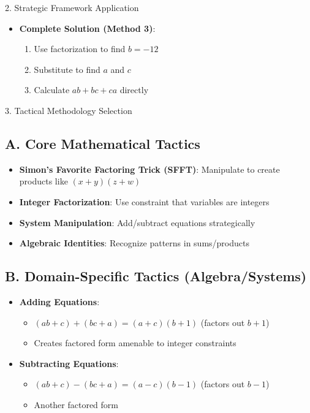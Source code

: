 \documentclass[12pt]{article}
\begin{document}
\begin{strategybox}{2. Strategic Framework Application}
\begin{itemize}[leftmargin=*]
    \item \textbf{Complete Solution (Method 3)}:
    \begin{enumerate}
        \item Use factorization to find $b = -12$
        \item Substitute to find $a$ and $c$
        \item Calculate $ab + bc + ca$ directly
    \end{enumerate}
\end{itemize}

\end{strategybox}

\begin{tacticsbox}{3. Tactical Methodology Selection}

\subsection*{A. Core Mathematical Tactics}
\begin{itemize}[leftmargin=*]
    \item \textbf{Simon's Favorite Factoring Trick (SFFT)}: Manipulate to create products like $(x+y)(z+w)$
    
    \item \textbf{Integer Factorization}: Use constraint that variables are integers
    
    \item \textbf{System Manipulation}: Add/subtract equations strategically
    
    \item \textbf{Algebraic Identities}: Recognize patterns in sums/products
\end{itemize}

\subsection*{B. Domain-Specific Tactics (Algebra/Systems)}
\begin{itemize}[leftmargin=*]
    \item \textbf{Adding Equations}: 
    \begin{itemize}
        \item $(ab + c) + (bc + a) = (a+c)(b+1)$ (factors out $b+1$)
        \item Creates factored form amenable to integer constraints
    \end{itemize}
    
    \item \textbf{Subtracting Equations}: 
    \begin{itemize}
        \item $(ab + c) - (bc + a) = (a-c)(b-1)$ (factors out $b-1$)
        \item Another factored form
    \end{itemize}
    

\end{itemize}
\end{tacticsbox}
\end{document}
